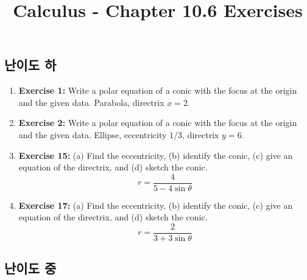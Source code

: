 \documentclass[12pt, a4paper]{article}
\title{Calculus - Chapter 10.6 Exercises}
\author{}
\date{}
\begin{document}
\maketitle
\hrulefill
\vspace{1em}

\subsection*{난이도 하}

\begin{enumerate}
    \item \textbf{Exercise 1:} Write a polar equation of a conic with the focus at the origin and the given data. Parabola, directrix $x=2$.

    \item \textbf{Exercise 2:} Write a polar equation of a conic with the focus at the origin and the given data. Ellipse, eccentricity $1/3$, directrix $y=6$.

    \item \textbf{Exercise 15:} (a) Find the eccentricity, (b) identify the conic, (c) give an equation of the directrix, and (d) sketch the conic.
    \[ r = \frac{4}{5 - 4\sin\theta} \]

    \item \textbf{Exercise 17:} (a) Find the eccentricity, (b) identify the conic, (c) give an equation of the directrix, and (d) sketch the conic.
    \[ r = \frac{2}{3 + 3\sin\theta} \]
\end{enumerate}

\hrulefill
\vspace{1em}

\subsection*{난이도 중}
\end{document}
